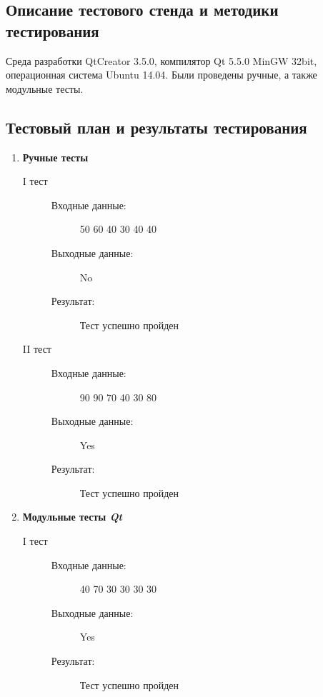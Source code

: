 \documentclass[12pt,a4paper]{report}
\begin{document}
\subsection{Описание тестового стенда и методики тестирования}
\hspace{\parindent}
Среда разработки QtCreator 3.5.0, компилятор Qt 5.5.0 MinGW 32bit, операционная система Ubuntu 14.04. Были проведены ручные, а также модульные тесты.

\subsection{Тестовый план и результаты тестирования}
\begin{enumerate}
\item \textbf{Ручные тесты}
\begin{description}
\item[I тест]
\hspace{\parindent}
\begin{flushleft}
\begin{description}
\item[Входные данные:] 50 60 40 30 40 40
\item[Выходные данные:] No
\item[Результат:] Тест успешно пройден
\end{description}
\end{flushleft}
\end{description}

\begin{description}
\item[II тест]
\hspace{\parindent}
\begin{flushleft}
\begin{description}
\item[Входные данные:] 90 90 70 40 30 80
\item[Выходные данные:] Yes
\item[Результат:] Тест успешно пройден
\end{description}
\end{flushleft}
\end{description}

\item \textbf{Модульные тесты \textit{Qt}}
\begin{description}
\item[I тест]
\hspace{\parindent}
\begin{flushleft}
\begin{description}
\item[Входные данные:] 40 70 30 30 30 30
\item[Выходные данные:] Yes
\item[Результат:] Тест успешно пройден
\end{description}
\end{flushleft}
\end{description}


\end{enumerate}
\end{document}
